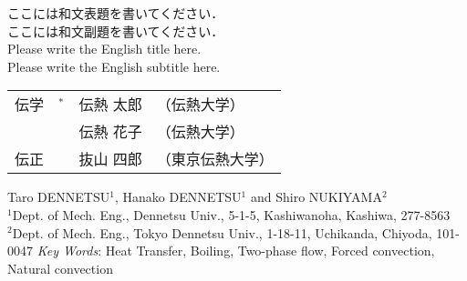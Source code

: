 \documentclass[
    paper=a4paper,      %
    article,            %
    fleqn,              %
    fontsize=10pt,      %
    jafontsize=10pt,    %
    head_space=20mm,    %
    foot_space=25mm,    %
    gutter=20mm,        %
    fore-edge=20mm      %
    ]{jlreq}            %
\begin{document}
\thispagestyle{nhts}

\begin{center}
    \fontsize{14pt}{18pt}\selectfont
    {\gtfamily
    ここには和文表題を書いてください．
    }\\\fontsize{12pt}{14pt}\selectfont
    {\gtfamily
    ここには和文副題を書いてください．
    }\\
    Please write the English title here.
    \\
    Please write the English subtitle here.
    \vskip12pt\fontsize{10pt}{12pt}\selectfont
    \begin{tabular}{lrll}
      伝学  &$^\ast$\hspace{-3mm} &伝熱 太郎  &（伝熱大学）\\
        & &伝熱 花子  &（伝熱大学）\\
      伝正  & &抜山 四郎  &（東京伝熱大学）
    \end{tabular}
    \vskip12pt
    Taro DENNETSU$^1$, Hanako DENNETSU$^1$ and Shiro NUKIYAMA$^2$
    \\
    $^1$Dept. of Mech. Eng., Dennetsu Univ., 5-1-5, Kashiwanoha, Kashiwa, 277-8563 \\
    $^2$Dept. of Mech. Eng., Tokyo Dennetsu Univ., 1-18-11, Uchikanda, Chiyoda, 101-0047
    \vskip12pt
    \textit{Key Words}: 
    Heat Transfer, Boiling, Two-phase flow, Forced convection, Natural convection
    \vskip12pt
\end{center}

\end{document}
